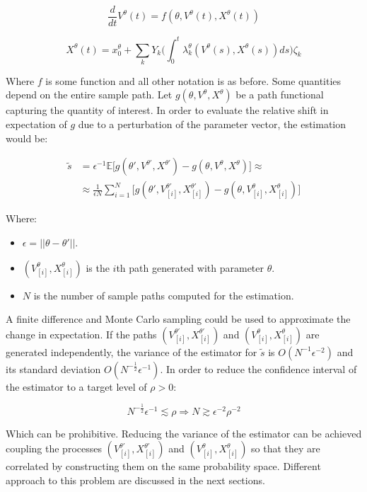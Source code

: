 $$\frac{d}{dt}V^\theta(t) = f(\theta, V^\theta(t), X^\theta(t))$$

$$X^\theta(t) = x_0^\theta + \sum\limits_kY_k\biggl(\int_0^t\lambda_k^\theta(V^\theta(s), X^\theta(s))ds\biggr)\zeta_k$$

Where $f$ is some function and all other notation is as before.
Some quantities depend on the entire sample path.
Let $g(\theta, V^\theta, X^\theta)$ be a path functional capturing the quantity of interest.
In order to evaluate the relative shift in expectation of $g$ due to a perturbation of the parameter vector, the estimation would be:

\begin{align*}
	\tilde{s} &=\epsilon^{-1}\mathbb{E}\bigl[g(\theta', V^{\theta'}, X^{\theta'})-g(\theta, V^\theta, X^\theta)\bigr]\approx\\
						&\approx\frac{1}{\epsilon N}\sum\limits_{i=1}^N\bigl[g(\theta', V_{[i]}^{\theta'}, X_{[i]}^{\theta'})-g(\theta, V_{[i]}^\theta, X_{[i]}^\theta)\bigr]
\end{align*}

Where:

\begin{itemize}
	\item $\epsilon= ||\theta-\theta'||$.
	\item $(V_{[i]}^\theta, X_{[i]}^{\theta})$ is the $i$th path generated with parameter $\theta$.
	\item $N$ is the number of sample paths computed for the estimation.
\end{itemize}

A finite difference and Monte Carlo sampling could be used to approximate the change in expectation.
If the paths $(V_{[i]}^{\theta'}, X_{[i]}^{\theta'})$ and $(V_{[i]}^\theta, X_{[i]}^{\theta})$ are generated independently, the variance of the estimator for $\tilde{s}$ is $O(N^{-1}\epsilon^{-2})$ and its standard deviation $O(N^{-\frac{1}{2}}\epsilon^{-1})$.
In order to reduce the confidence interval of the estimator to a target level of $\rho >0$:

$$N^{-\frac{1}{2}}\epsilon^{-1}\lesssim\rho\Rightarrow N \gtrsim\epsilon^{-2}\rho^{-2}$$

Which can be prohibitive.
Reducing the variance of the estimator can be achieved coupling the processes $(V_{[i]}^{\theta'}, X_{[i]}^{\theta'})$ and $(V_{[i]}^\theta, X_{[i]}^{\theta})$ so that they are correlated by constructing them on the same probability space.
Different approach to this problem are discussed in the next sections.

